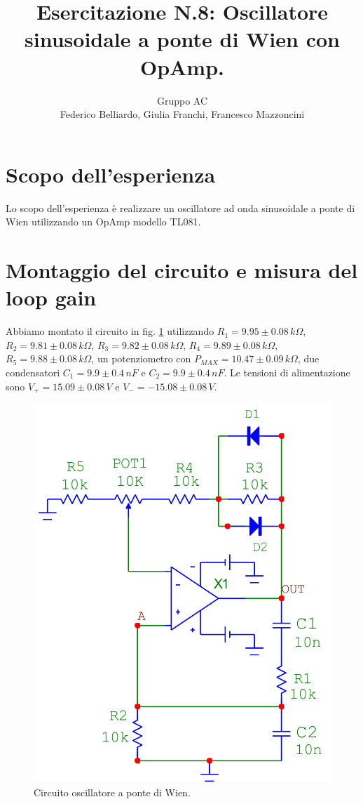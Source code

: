 \documentclass[10pt,a4paper]{article}
\author{Gruppo AC \\ Federico Belliardo, Giulia Franchi, Francesco Mazzoncini}
\title{Esercitazione N.8: Oscillatore sinusoidale a ponte di Wien con OpAmp.}
\begin{document}
\maketitle
\section{Scopo dell'esperienza}
Lo scopo dell'esperienza è realizzare un oscillatore ad onda sinusoidale a ponte di Wien utilizzando un OpAmp modello TL081.\\
\section{Montaggio del circuito e misura del loop gain}
Abbiamo montato il circuito in fig. \ref{oscillatore} utilizzando $R_1=9.95\pm0.08\,k\Omega$, $R_2=9.81\pm0.08\,k\Omega$, $R_3=9.82\pm0.08\,k\Omega$, $R_4=9.89\pm0.08\,k\Omega$, $R_5=9.88\pm0.08\,k\Omega$, un potenziometro con $P_{MAX}=10.47\pm0.09\,k\Omega$, due condensatori $C_1=9.9\pm0.4\,nF$ e $C_2=9.9\pm0.4\,nF$. Le tensioni di alimentazione sono $V_{+} = 15.09 \pm 0.08 \, V$ e $V_{-} = -15.08 \pm 0.08 \, V$.\\

\begin{figure}[!htb]
  \centering
  \includegraphics[scale=0.25]{ponteDiWien.png}
\caption{Circuito oscillatore a ponte di Wien.}
\label{oscillatore}
\end{figure}
\end{document}
